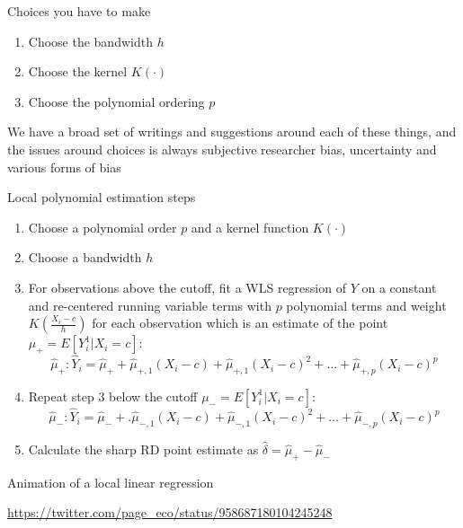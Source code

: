\documentclass{beamer}
\begin{document}
\begin{frame}{Choices you have to make}

\begin{enumerate}
\item Choose the bandwidth $h$
\item Choose the kernel $K(\cdot)$
\item Choose the polynomial ordering $p$
\end{enumerate}
\bigskip
We have a broad set of writings and suggestions around each of these things, and the issues around choices is always subjective researcher bias, uncertainty and various forms of bias

\end{frame}



\begin{frame}{Local polynomial estimation steps}

\begin{enumerate}
\item Choose a polynomial order $p$ and a kernel function $K(\cdot)$
\item Choose a bandwidth $h$
\item For observations above the cutoff, fit a WLS regression of $Y$ on a constant and re-centered running variable terms with $p$ polynomial terms and weight $K(\frac{X_i-c}{h})$ for each observation which is an estimate of the point$\mu_+=E[Y_i^1|X_i=c]$:$$\widehat{\mu}_+:\widehat{Y}_i=\widehat{\mu}_+ + \widehat{\mu}_{+,1}(X_i-c)+\widehat{\mu}_{+,1}(X_i-c)^2 + \dots + \widehat{\mu}_{+,p}(X_i-c)^p$$
\item Repeat step 3 below the cutoff $\mu_-=E[Y_i^1|X_i=c]$:$$\widehat{\mu}_-:\widehat{Y}_i=\widehat{\mu}_- +. \widehat{\mu}_{-,1}(X_i-c)+\widehat{\mu}_{-,1}(X_i-c)^2 + \dots + \widehat{\mu}_{-,p}(X_i-c)^p$$
\item Calculate the sharp RD point estimate as $\widehat{\delta}=\widehat{\mu}_+ - \widehat{\mu}_-$
\end{enumerate}

\end{frame}


\begin{frame}{Animation of a local linear regression}

\url{https://twitter.com/page_eco/status/958687180104245248}

\end{frame}
\end{document}

